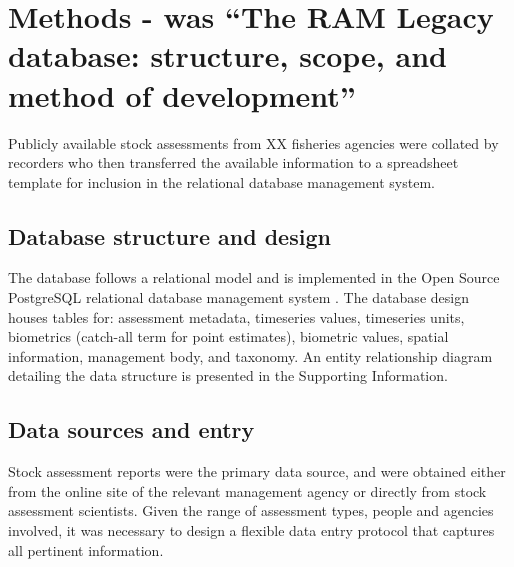 \documentclass[letterpaper,12pt]{article}
\begin{document}
\newpage
\section{Methods - was ``The RAM Legacy database: structure, scope, and method of development''}

Publicly available stock assessments from XX fisheries
agencies were collated by recorders who then transferred the available information to a spreadsheet template for inclusion in
the relational database management system.

\subsection{Database structure and design}
The database follows a relational model and is implemented in the Open
Source PostgreSQL relational database management system \citep{postgresql:2009}. The database design houses tables
for: assessment metadata, timeseries values, timeseries units,
biometrics (catch-all term for point estimates), biometric values,
spatial information, management body, and taxonomy. An entity
relationship diagram detailing the data structure is presented in the
Supporting Information.

\subsection{Data sources and entry}
Stock assessment reports were the primary data source, and were
obtained either from the online site of the relevant management agency
or directly from stock assessment scientists. Given the range of
assessment types, people and agencies involved, it was necessary to
design a flexible data entry protocol that captures all pertinent
information.
\end{document}
